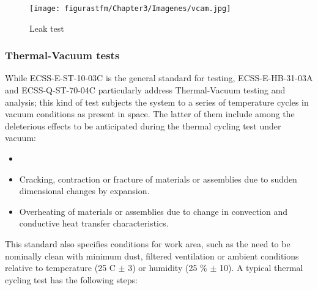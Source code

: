 	\begin{figure} [H] 				
				\centering
				\texttt{[image: figurastfm/Chapter3/Imagenes/vcam.jpg]}
				\caption{Leak test \cite{ESA}} \label{leaktest}
			\end{figure}

\subsubsection{Thermal-Vacuum tests}

While ECSS-E-ST-10-03C \cite{ESAtest} is the general standard for testing, ECSS-E-HB-31-03A \cite{ESAthermal1} and ECSS-Q-ST-70-04C \cite{ESAthermal2} particularly address Thermal-Vacuum testing and analysis; this kind of test subjects the system to a series of temperature cycles in vacuum conditions as present in space. The latter of them include among the deleterious effects to be anticipated during the thermal cycling test under vacuum:  

\begin{itemize}

	\item{}
	\item{Cracking, contraction or fracture of materials or assemblies due to sudden dimensional changes by expansion.}
	\item{Overheating of materials or assemblies due to change in convection and conductive heat transfer characteristics.}


\end{itemize}

This standard also specifies conditions for work area, such as the need to be nominally clean with minimum dust, filtered ventilation or ambient conditions relative to temperature (25 \textdegree	C $\pm$ 3) or humidity (25 \%	$\pm$ 10). A typical thermal cycling test has the following steps:

